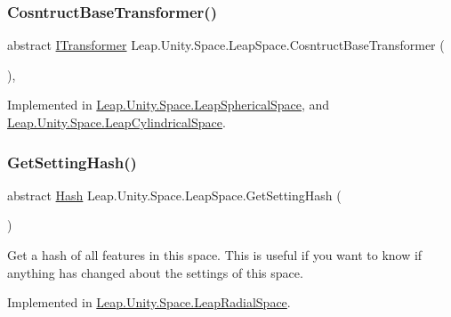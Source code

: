 \subsubsection{\texorpdfstring{CosntructBaseTransformer()}{CosntructBaseTransformer()}}
{\footnotesize\ttfamily abstract \mbox{\hyperlink{interface_leap_1_1_unity_1_1_space_1_1_i_transformer}{I\+Transformer}} Leap.\+Unity.\+Space.\+Leap\+Space.\+Cosntruct\+Base\+Transformer (\begin{DoxyParamCaption}{ }\end{DoxyParamCaption})\hspace{0.3cm}{\ttfamily [protected]}, {}}



Implemented in \mbox{\hyperlink{class_leap_1_1_unity_1_1_space_1_1_leap_spherical_space_af44aeded1cf4e35a2e780a6caa02b674}{Leap.\+Unity.\+Space.\+Leap\+Spherical\+Space}}, and \mbox{\hyperlink{class_leap_1_1_unity_1_1_space_1_1_leap_cylindrical_space_a65ae2afb61d3f9fe727a5a08dcc6a2ec}{Leap.\+Unity.\+Space.\+Leap\+Cylindrical\+Space}}.

\mbox{\label{class_leap_1_1_unity_1_1_space_1_1_leap_space_a42752b3c5be3fadbca02e0060a8cc7ea}} 
\subsubsection{\texorpdfstring{GetSettingHash()}{GetSettingHash()}}
{\footnotesize\ttfamily abstract \mbox{\hyperlink{struct_leap_1_1_unity_1_1_hash}{Hash}} Leap.\+Unity.\+Space.\+Leap\+Space.\+Get\+Setting\+Hash (\begin{DoxyParamCaption}{ }\end{DoxyParamCaption})\hspace{0.3cm}{\ttfamily [pure virtual]}}



Get a hash of all features in this space. This is useful if you want to know if anything has changed about the settings of this space. 



Implemented in \mbox{\hyperlink{class_leap_1_1_unity_1_1_space_1_1_leap_radial_space_a65716a3a40c5dc3bcf957b05f878960c}{Leap.\+Unity.\+Space.\+Leap\+Radial\+Space}}.

